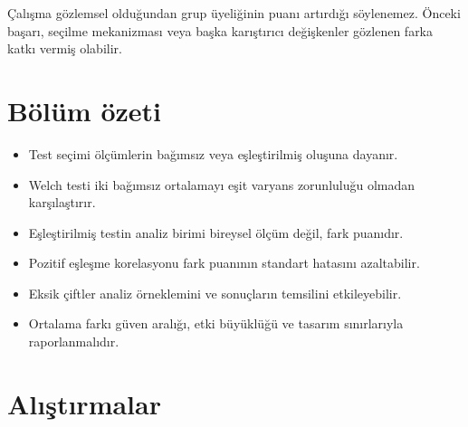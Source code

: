 Çalışma gözlemsel olduğundan grup üyeliğinin puanı artırdığı söylenemez.
Önceki başarı, seçilme mekanizması veya başka karıştırıcı değişkenler gözlenen
farka katkı vermiş olabilir.







\section{Bölüm özeti}

\begin{itemize}
  \item Test seçimi ölçümlerin bağımsız veya eşleştirilmiş oluşuna dayanır.
  \item Welch testi iki bağımsız ortalamayı eşit varyans zorunluluğu olmadan karşılaştırır.
  \item Eşleştirilmiş testin analiz birimi bireysel ölçüm değil, fark puanıdır.
  \item Pozitif eşleşme korelasyonu fark puanının standart hatasını azaltabilir.
  \item Eksik çiftler analiz örneklemini ve sonuçların temsilini etkileyebilir.
  \item Ortalama farkı güven aralığı, etki büyüklüğü ve tasarım sınırlarıyla raporlanmalıdır.
\end{itemize}

\section*{Alıştırmalar}

